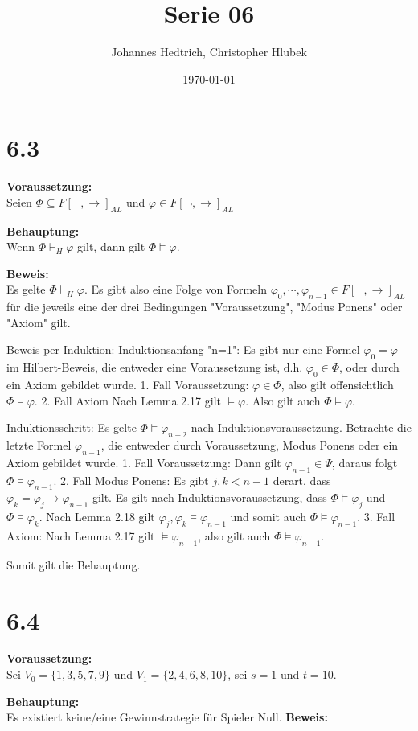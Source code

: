 \documentclass[12pt,a4paper]{scrartcl}
\title{Serie 06}
\author{Johannes Hedtrich, Christopher Hlubek}
\date{\today}
\begin{document}
	\section*{6.3}
	\noindent
	\textbf{Voraussetzung:}\\
	Seien $\Phi \subseteq F[\neg, \rightarrow]_{AL}$ und $\varphi \in F[\neg, \rightarrow]_{AL}$

	\noindent
	\textbf{Behauptung:}\\ 
	Wenn $\Phi \vdash_H \varphi$ gilt, dann gilt $\Phi \models \varphi$.

	\noindent
	\textbf{Beweis:}\\
	Es gelte $\Phi \vdash_H \varphi$. Es gibt also eine Folge von Formeln $\varphi_0, \cdots , \varphi_{n-1} \in F[\neg, \rightarrow]_{AL}$ für die jeweils eine der drei Bedingungen "Voraussetzung", "Modus Ponens" oder "Axiom" gilt.

	Beweis per Induktion:
	Induktionsanfang "n=1":
	Es gibt nur eine Formel $\varphi_0 = \varphi$ im Hilbert-Beweis, die entweder eine Voraussetzung ist, d.h. $\varphi_0 \in \Phi$, oder durch ein Axiom gebildet wurde.
	1. Fall Voraussetzung:
	$\varphi \in \Phi$, also gilt offensichtlich $\Phi \models \varphi$.
	2. Fall Axiom
	Nach Lemma 2.17 gilt $\models \varphi$. Also gilt auch $\Phi \models \varphi$.

	Induktionsschritt:
	Es gelte $\Phi \models \varphi_{n-2}$ nach Induktionsvoraussetzung. Betrachte die letzte Formel $\varphi_{n-1}$, die entweder durch Voraussetzung, Modus Ponens oder ein Axiom gebildet wurde.
	1. Fall Voraussetzung:
	Dann gilt $\varphi_{n-1} \in \Psi$, daraus folgt $\Phi \models \varphi_{n-1}$.
	2. Fall Modus Ponens:
	Es gibt $j,k < n-1$ derart, dass $\varphi_k = \varphi_j \rightarrow \varphi_{n-1}$ gilt. Es gilt nach Induktionsvoraussetzung, dass $\Phi \models \varphi_j$ und $\Phi \models \varphi_k$. Nach Lemma 2.18 gilt ${\varphi_j, \varphi_k} \models \varphi_{n-1}$ und somit auch $\Phi \models \varphi_{n-1}$.
	3. Fall Axiom:
	Nach Lemma 2.17 gilt $\models \varphi_{n-1}$, also gilt auch $\Phi \models \varphi_{n-1}$.

	\noindent
	Somit gilt die Behauptung.

\section*{6.4}

\textbf{Voraussetzung:}\\
Sei $V_0 = \{1,3,5,7,9\}$ und $V_1 = \{2,4,6,8,10\}$, sei $s = 1$ und $t = 10$.

\textbf{Behauptung:}\\ 
Es existiert keine/eine Gewinnstrategie für Spieler Null.
\noindent
\textbf{Beweis: }
\end{document}

